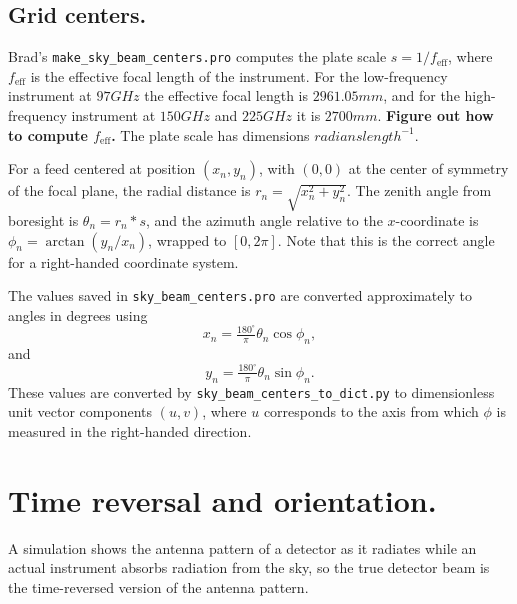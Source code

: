 \documentclass[10pt,english]{article}
\begin{document}
\subsection*{Grid centers.}

Brad's \texttt{make\_sky\_beam\_centers.pro} computes the plate scale $s = 1 / f_{\text{eff}}$, where $f_{\text{eff}}$ is the effective focal length of the instrument. For the low-frequency instrument at $97 \unit{GHz}$ the effective focal length is $2961.05 \unit{mm}$, and for the high-frequency instrument at $150 \unit{GHz}$ and $225 \unit{GHz}$ it is $2700 \unit{mm}$. \textbf{Figure out how to compute $f_{\text{eff}}$.} The plate scale has dimensions $\unit{radians} \unit{length}^{-1}$.

For a feed centered at position $(x_{n}, y_{n})$, with $(0, 0)$ at the center of symmetry of the focal plane, the radial distance is $r_{n} = \sqrt{x_{n}^{2} + y_{n}^{2}}$. The zenith angle from boresight is $\theta_{n} = r_{n} * s$, and the azimuth angle relative to the $x$-coordinate is $\phi_{n} = \arctan(y_{n} / x_{n})$, wrapped to $[0, 2 \pi]$. Note that this is the correct angle for a right-handed coordinate system.

The values saved in \texttt{sky\_beam\_centers.pro} are converted approximately to angles in degrees using
\begin{equation*}
x_{n} = \tfrac{180^{\circ}}{\pi} \theta_{n} \cos \phi_{n},
\end{equation*}
and
\begin{equation*}
y_{n} = \tfrac{180^{\circ}}{\pi} \theta_{n} \sin \phi_{n}.
\end{equation*}
These values are converted by \texttt{sky\_beam\_centers\_to\_dict.py} to dimensionless unit vector components $(u, v)$, where $u$ corresponds to the axis from which $\phi$ is measured in the right-handed direction.

\section*{Time reversal and orientation.}

A simulation shows the antenna pattern of a detector as it radiates while an actual instrument absorbs radiation from the sky, so the true detector beam is the time-reversed version of the antenna pattern. 
\end{document}
